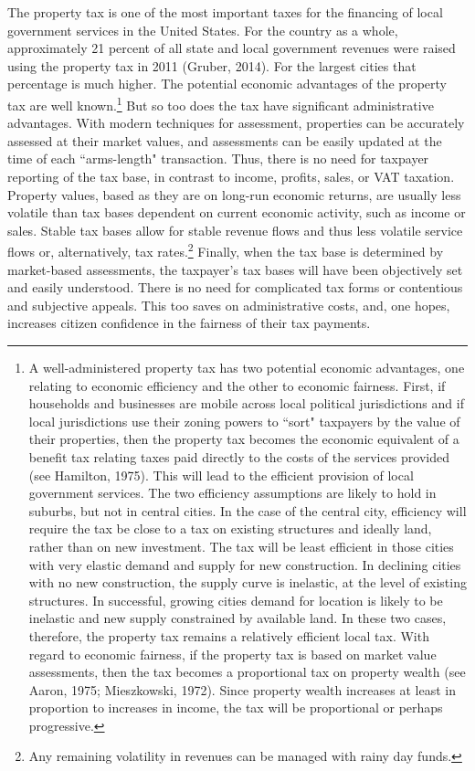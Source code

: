 \documentclass[12pt,titlepage]{article}
\begin{document}
The property tax is one of the most important taxes for the financing
of local government services in the United States.  For the country as
a whole, approximately 21 percent of all state and local government
revenues were raised using the property tax in 2011 (Gruber, 2014).
For the largest cities that percentage is much higher.  The potential
economic advantages of the property tax are well known.\footnote{A
  well-administered property tax has two potential economic
  advantages, one relating to economic efficiency and the other to
  economic fairness.  First, if households and businesses are mobile
  across local political jurisdictions and if local jurisdictions use
  their zoning powers to ``sort" taxpayers by the value of their
  properties, then the property tax becomes the economic equivalent of
  a benefit tax relating taxes paid directly to the costs of the
  services provided (see Hamilton, 1975).  This will lead to the
  efficient provision of local government services.  The two
  efficiency assumptions are likely to hold in suburbs, but not in
  central cities.  In the case of the central city, efficiency will
  require the tax be close to a tax on existing structures and ideally
  land, rather than on new investment.  The tax will be least
  efficient in those cities with very elastic demand and supply for
  new construction.  In declining cities with no new construction, the
  supply curve is inelastic, at the level of existing structures.  In
  successful, growing cities demand for location is likely to be
  inelastic and new supply constrained by available land.  In these
  two cases, therefore, the property tax remains a relatively
  efficient local tax.  With regard to economic fairness, if the
  property tax is based on market value assessments, then the tax
  becomes a proportional tax on property wealth (see Aaron, 1975;
  Mieszkowski, 1972).  Since property wealth increases at least in
  proportion to increases in income, the tax will be proportional or
  perhaps progressive.}  But so too does the tax have significant
administrative advantages.  With modern techniques for assessment,
properties can be accurately assessed at their market values, and
assessments can be easily updated at the time of each ``arms-length"
transaction.  Thus, there is no need for taxpayer reporting of the tax
base, in contrast to income, profits, sales, or VAT taxation.  Property
values, based as they are on long-run economic returns, are usually
less volatile than tax bases dependent on current economic activity,
such as income or sales. Stable tax bases allow for stable revenue
flows and thus less volatile service flows or, alternatively, tax
rates.\footnote{Any remaining volatility in revenues can be managed
  with rainy day funds.} Finally, when the tax base is determined by
market-based assessments, the taxpayer's tax bases will have been
objectively set and easily understood.  There is no need for
complicated tax forms or contentious and subjective appeals.  This too saves on
administrative costs, and, one hopes, increases citizen confidence in
the fairness of their tax payments.
\end{document}
